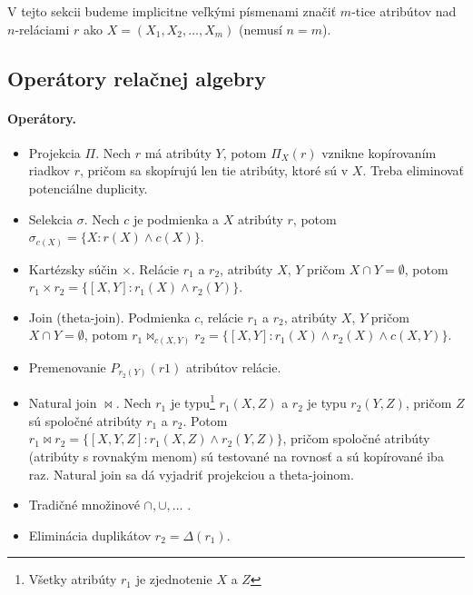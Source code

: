 \documentclass[10pt,a4paper]{article}
\begin{document}
V tejto sekcii budeme implicitne veľkými písmenami značiť $m$-tice atribútov nad $n$-reláciami $r$ ako $X = (X_1, X_2, \ldots, X_m)$ (nemusí $n=m$).

\subsection{Operátory relačnej algebry}

\paragraph{Operátory.}
\begin{itemize}
\item Projekcia $\Pi$. Nech $r$ má atribúty $Y$, potom $\Pi_X(r)$ vznikne kopírovaním riadkov $r$, pričom sa skopírujú len tie atribúty, ktoré sú v $X$. Treba eliminovať potenciálne duplicity.
\item Selekcia $\sigma$. Nech $c$ je podmienka a $X$ atribúty $r$, potom $\sigma_{c(X)} = \{X:r(X) \wedge c(X)\}$.
\item Kartézsky súčin $\times$. Relácie $r_1$ a $r_2$, atribúty $X$, $Y$ pričom $X \cap Y = \emptyset$, potom $r_1 \times r_2 = \{[X,Y]:r_1(X) \wedge r_2(Y)\}$.
\item Join (theta-join). Podmienka $c$, relácie $r_1$ a $r_2$, atribúty $X$, $Y$ pričom $X \cap Y = \emptyset$, potom $r_1 \Join_{c(X,Y)} r_2 = \{[X,Y]:r_1(X) \wedge r_2(X) \wedge c(X,Y)\}$.
\item Premenovanie $P_{r_2(Y)}(r1)$ atribútov relácie.
\item Natural join $\Join$. Nech $r_1$ je typu\footnote{Všetky atribúty $r_1$ je zjednotenie $X$ a $Z$} $r_1(X, Z)$ a $r_2$ je typu $r_2(Y, Z)$, pričom $Z$ sú spoločné
atribúty $r_1$ a $r_2$. Potom $r_1 \Join r_2 = \{[X,Y,Z]:r_1(X,Z) \wedge r_2(Y,Z)\}$, pričom
spoločné atribúty (atribúty s rovnakým menom) sú testované na
rovnosť a sú kopírované iba raz. Natural join sa dá vyjadriť projekciou a theta-joinom.
\item Tradičné množinové $\cap, \cup, \ldots $ .
\item Eliminácia duplikátov $r_2 = \Delta(r_1)$.
\end{itemize}
\end{document}
